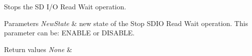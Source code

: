 Stops the S\+D I/\+O Read Wait operation. 


\begin{DoxyParams}{Parameters}
{\em New\+State} & new state of the Stop S\+D\+I\+O Read Wait operation. This parameter can be\+: E\+N\+A\+B\+L\+E or D\+I\+S\+A\+B\+L\+E. \\
\hline
\end{DoxyParams}

\begin{DoxyRetVals}{Return values}
{\em None} & \\
\hline
\end{DoxyRetVals}
